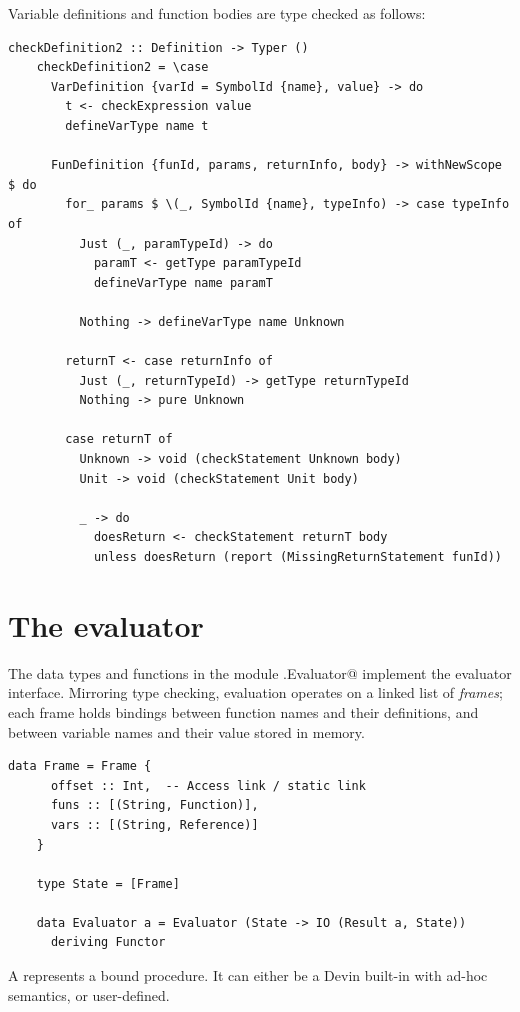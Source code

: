 \documentclass[UdineBachThesis,american,11pt]{PhdThesis}
\begin{document}
  Variable definitions and function bodies are type checked as follows:

  \begin{lstlisting}[gobble=4,basicstyle=\ttfamily\small]
    checkDefinition2 :: Definition -> Typer ()
    checkDefinition2 = \case
      VarDefinition {varId = SymbolId {name}, value} -> do
        t <- checkExpression value
        defineVarType name t

      FunDefinition {funId, params, returnInfo, body} -> withNewScope $ do
        for_ params $ \(_, SymbolId {name}, typeInfo) -> case typeInfo of
          Just (_, paramTypeId) -> do
            paramT <- getType paramTypeId
            defineVarType name paramT

          Nothing -> defineVarType name Unknown

        returnT <- case returnInfo of
          Just (_, returnTypeId) -> getType returnTypeId
          Nothing -> pure Unknown

        case returnT of
          Unknown -> void (checkStatement Unknown body)
          Unit -> void (checkStatement Unit body)

          _ -> do
            doesReturn <- checkStatement returnT body
            unless doesReturn (report (MissingReturnStatement funId))
  \end{lstlisting}

  \section{The evaluator}

  The data types and functions in the module \lstinline@Devin.Evaluator@
  implement the evaluator interface. Mirroring type checking, evaluation
  operates on a linked list of \emph{frames}; each frame holds bindings between
  function names and their definitions, and between variable names and their
  value stored in memory.

  \begin{lstlisting}[gobble=4,basicstyle=\ttfamily\small]
    data Frame = Frame {
      offset :: Int,  -- Access link / static link
      funs :: [(String, Function)],
      vars :: [(String, Reference)]
    }

    type State = [Frame]

    data Evaluator a = Evaluator (State -> IO (Result a, State))
      deriving Functor
  \end{lstlisting}

  A \lstinline@Function@ represents a bound procedure. It can either be a Devin
  built-in with ad-hoc semantics, or user-defined.
\end{document}
